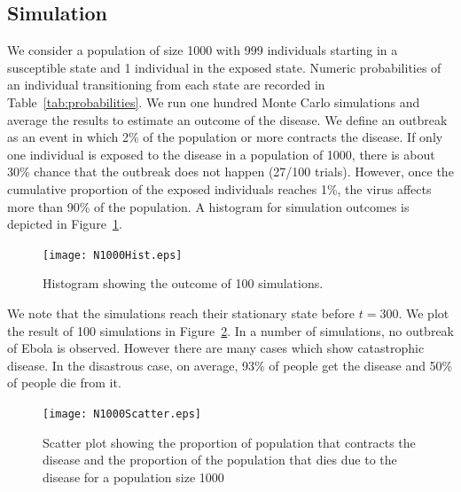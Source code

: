 \subsection{Simulation}
We consider a population of size 1000 with 999 individuals starting in a susceptible state and 1 individual in the exposed state. Numeric probabilities of an individual transitioning from each state are recorded in Table~\ref{tab:probabilities}. We run one hundred Monte Carlo simulations and average the results to estimate an outcome of the disease. We define an outbreak as an event in which 2\% of the population or more contracts the disease. If only one individual is exposed to the disease in a population of 1000, there is about 30\% chance that the outbreak does not happen (27/100 trials). However, once the cumulative proportion of the exposed individuals reaches 1\%, the virus affects more than 90\% of the population. A histogram for simulation outcomes is depicted in Figure~\ref{fig:Hist}.
%
%
%
%
%
%
\begin{figure}[h!]
\begin{center}
\texttt{[image: N1000Hist.eps]}
\end{center}
\caption{Histogram showing the outcome of 100 simulations.}
\label{fig:Hist}
\end{figure}


We note that the simulations reach their stationary state before $t = 300$. We plot the result of 100 simulations in Figure~\ref{fig:Scatter}. In a number of simulations, no outbreak of Ebola is observed. However there are many cases which show catastrophic disease. In the disastrous case, on average, 93\% of people get the disease and 50\% of people die from it. 

 
\begin{figure}[h!]
\begin{center}
\texttt{[image: N1000Scatter.eps]}
\end{center}
\caption{Scatter plot showing the proportion of population that contracts the disease and the proportion of the population that dies due to the disease for a population size 1000 }%
\label{fig:Scatter}
\end{figure}

